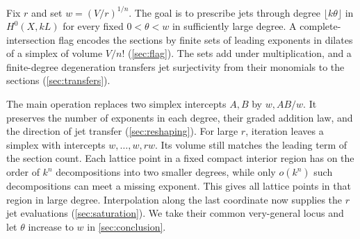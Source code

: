 Fix $r$ and set $w=(V/r)^{1/n}$. The goal is to prescribe jets through degree $\lfloor k\theta\rfloor$ in $H^0(X,kL)$ for every fixed $0<\theta<w$ in sufficiently large degree. A complete-intersection flag encodes the sections by finite sets of leading exponents in dilates of a simplex of volume $V/n!$ (\cref{sec:flag}). The sets add under multiplication, and a finite-degree degeneration transfers jet surjectivity from their monomials to the sections (\cref{sec:transfers}).

The main operation replaces two simplex intercepts $A,B$ by $w,AB/w$. It preserves the number of exponents in each degree, their graded addition law, and the direction of jet transfer (\cref{sec:reshaping}). For large $r$, iteration leaves a simplex with intercepts $w,\ldots,w,rw$. Its volume still matches the leading term of the section count. Each lattice point in a fixed compact interior region has on the order of $k^n$ decompositions into two smaller degrees, while only $o(k^n)$ such decompositions can meet a missing exponent. This gives all lattice points in that region in large degree. Interpolation along the last coordinate now supplies the $r$ jet evaluations (\cref{sec:saturation}). We take their common very-general locus and let $\theta$ increase to $w$ in \cref{sec:conclusion}.
